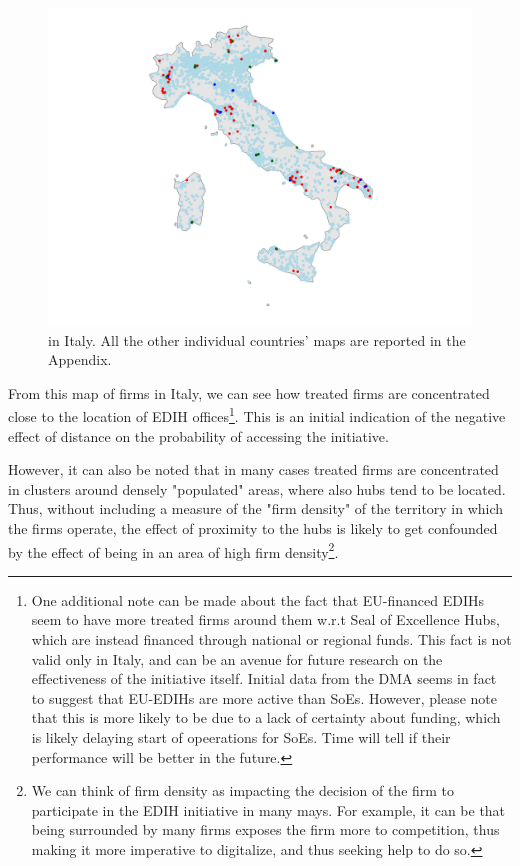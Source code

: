 \documentclass[12pt]{report}
\begin{document}
\begin{figure}[h!]
    \centering
    \includegraphics[width=\linewidth]{../Output/IT_map.pdf}
    \caption{ in Italy. All the other individual countries' maps are reported in the Appendix.}
    \label{fig:map_obs_IT}
\end{figure}

\par From this map of firms in Italy, we can see how treated firms are concentrated close to the location of EDIH offices\footnote{One additional note can be made about the fact that EU-financed EDIHs seem to have more treated firms around them w.r.t Seal of Excellence Hubs, which are instead financed through national or regional funds. This fact is not valid only in Italy, and can be an avenue for future research on the effectiveness of the initiative itself. Initial data from the DMA seems in fact to suggest that EU-EDIHs are more active than SoEs. However, please note that this is more likely to be due to a lack of certainty about funding, which is likely delaying start of opeerations for SoEs. Time will tell if their performance will be better in the future.}. This is an initial indication of the negative effect of distance on the probability of accessing the initiative.

\par However, it can also be noted that in many cases treated firms are concentrated in clusters around densely "populated" areas, where also hubs tend to be located. Thus, without including a measure of the "firm density" of the territory in which the firms operate, the effect of proximity to the hubs is likely to get confounded by the effect of being in an area of high firm density\footnote{We can think of firm density as impacting the decision of the firm to participate in the EDIH initiative in many mays. For example, it can be that being surrounded by many firms exposes the firm more to competition, thus making it more imperative to digitalize, and thus seeking help to do so.}.
\end{document}

